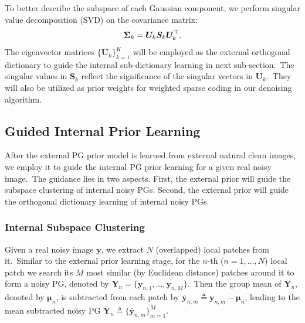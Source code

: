 To better describe the subspace of each Gaussian component, we perform singular value decomposition (SVD) \cite{eckart1936approximation} on the covariance matrix:
\vspace{-2mm}
\begin{equation}\label{equ2}
\vspace{-2mm}
\bm{\Sigma}_{k}=\bm{U}_{k}\bm{S}_{k}\bm{U}_{k}^{\top}.
\end{equation}
The eigenvector matrices $\{\bm{U}_{k}\}_{k=1}^{K}$ will be employed as the external orthogonal dictionary to guide the internal sub-dictionary learning in next sub-section.\ The singular values in $\bm{S}_{k}$ reflect the significance of the singular vectors in $\bm{U}_{k}$.\ They  will also be utilized as prior weights for weighted sparse coding in our denoising algorithm.


\subsection{Guided Internal Prior Learning}

After the external PG prior model is learned from external natural clean images, we employ it to guide the internal PG prior learning for a given real noisy image.\ The guidance lies in two aspects. First, the external prior will guide the subspace clustering of internal noisy PGs. Second, the external prior will guide the orthogonal dictionary learning of internal noisy PGs.

\subsubsection{Internal Subspace Clustering}

Given a real noisy image $\mathbf{y}$, we extract $N$ (overlapped) local patches from it.\ Similar to the external prior learning stage, for the $n$-th ($n=1,...,N$) local patch we search its $M$ most similar (by Euclidean distance) patches around it to form a noisy PG, denoted by $\bm{Y}_{n} = \{\mathbf{y}_{n,1},...,\mathbf{y}_{n,M}\}$.\ Then the group mean of $\bm{Y}_{n}$, denoted by $\bm{\mu}_{n}$, is subtracted from each patch by $\bm{\overline{y}}_{n,m}\triangleq\mathbf{y}_{n,m}-\bm{\mu}_{n}$, leading to the mean subtracted noisy PG $\bm{\overline{Y}}_{n}\triangleq \{\bm{\overline{y}}_{n,m}\}_{m=1}^{M}$.

